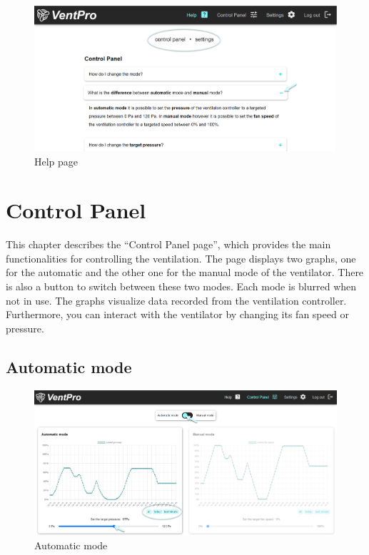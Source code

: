 \vspace{0.5cm}
\begin{figure}[h]
\centering
\includegraphics[width=1.0\textwidth]{img/Picture3}
\caption{Help page}
\label{fig:picture_3}
\end{figure}



\chapter{Control Panel}
\label{sec:control_panel}

This chapter describes the “Control Panel page”, which provides the main functionalities for controlling the ventilation. The page displays two graphs, one for the automatic and the other one for the manual mode of the ventilator. There is also a button to switch between these two modes. Each mode is blurred when not in use. The graphs visualize data recorded from the ventilation controller. Furthermore, you can interact with the ventilator by changing its fan speed or pressure.


\section{Automatic mode}
\label{sec:automatic_mode}

\begin{figure}[h]
\centering
\includegraphics[width=1.0\textwidth]{img/Picture4}
\caption{Automatic mode}
\label{fig:picture_4}
\end{figure}
\vspace{0.3cm}

